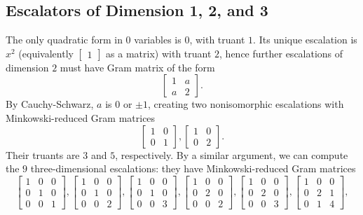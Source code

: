 \documentclass[letterpaper, 12pt]{article}
\begin{document}
\subsection{Escalators of Dimension 1, 2, and 3}
The only quadratic form in $0$ variables is $0$, with truant $1$. Its unique escalation is $x^2$ (equivalently $\begin{bmatrix} 1 \end{bmatrix}$ as a matrix) with truant $2$, hence further escalations of dimension $2$ must have Gram matrix of the form
\[\begin{bmatrix} 1 & a \\ a & 2 \end{bmatrix}.\]
By Cauchy-Schwarz, $a$ is $0$ or $\pm 1$, creating two nonisomorphic escalations with Minkowski-reduced Gram matrices
\[\begin{bmatrix} 1 & 0 \\ 0 & 1 \end{bmatrix}, \begin{bmatrix} 1 & 0 \\ 0 & 2 \end{bmatrix}.\]
Their truants are $3$ and $5$, respectively. By a similar argument, we can compute the $9$ three-dimensional escalations: they have Minkowski-reduced Gram matrices
\[\begin{bmatrix} 1 & 0 & 0 \\ 0 & 1 & 0 \\ 0 & 0 & 1 \end{bmatrix}, \begin{bmatrix} 1 & 0 & 0 \\ 0 & 1 & 0 \\ 0 & 0 & 2 \end{bmatrix}, \begin{bmatrix} 1 & 0 & 0 \\ 0 & 1 & 0 \\ 0 & 0 & 3 \end{bmatrix}, \begin{bmatrix} 1 & 0 & 0 \\ 0 & 2 & 0 \\ 0 & 0 & 2 \end{bmatrix}, \begin{bmatrix} 1 & 0 & 0 \\ 0 & 2 & 0 \\ 0 & 0 & 3 \end{bmatrix}, \begin{bmatrix} 1 & 0 & 0 \\ 0 & 2 & 1 \\ 0 & 1 & 4 \end{bmatrix},\]
\end{document}
